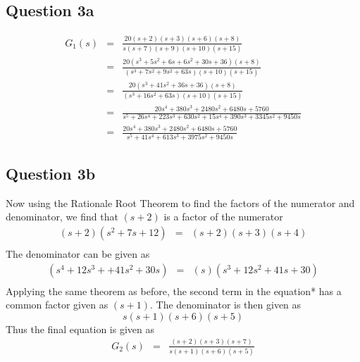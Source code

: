 \documentclass[12pt, a4paper]{article}
\begin{document}
		\subsection*{Question 3a}
		\label{sub:question_3a}
			\begin{equation*}
				\begin{array}{rcl}
					G_1(s) & = & \frac{20(s+2)(s+3)(s+6)(s+8)}{s(s+7)(s+9)(s+10)(s+15)}\\
					& = & \frac{20(s^3+5s^2+6s+6s^2+30s+36)(s+8)}{(s^3+7s^2+9s^2+63s)(s+10)(s+15)}\\
					& = & \frac{20(s^3+41s^2+36s+36)(s+8)}{(s^3+16s^2+63s)(s+10)(s+15)}\\
					& = & \frac{20s^4+380s^3+2480s^2+6480s+5760}{s^5+26s^4+223s^3+630s^2+15s^4+390s^3+3345s^2+9450s}\\
					& = & \frac{20s^4+380s^3+2480s^2+6480s+5760}{s^5+41s^4+613s^3+3975s^2+9450s}
				\end{array}
			\end{equation*} 

		\subsection*{Question 3b}
		\label{sub:question_3b}
			Now using the Rationale Root Theorem to find the factors of the numerator and denominator, we find that $(s+2)$ is a factor of the numerator
			\begin{equation*}
				\begin{array}{rcl}
				(s+2)(s^2+7s+12) & = & (s+2)(s+3)(s+4) \\
				\end{array}
			\end{equation*}
			The denominator can be given as
			\begin{equation*}
				\begin{array}{rcl}
				(s^4+12s^3++41s^2+30s) & = & (s)(s^3+12s^2+41s+30) \\
				\end{array}
			\end{equation*}
			Applying the same theorem as before, the second term in the equation* has a common factor given as $(s+1)$. The denominator is then given as 
			\begin{equation*}
					s(s+1)(s+6)(s+5)
			\end{equation*}
			Thus the final equation is given as 
			\begin{equation*}
				\begin{array}{rcl}
				G_2(s) & = & \frac{(s+2)(s+3)(s+7)}{s(s+1)(s+6)(s+5)}
				\end{array}
			\end{equation*}
\end{document}
